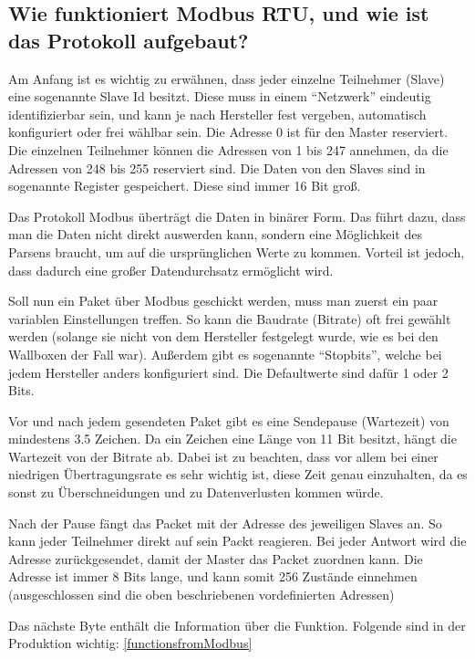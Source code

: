 \subsection{Wie funktioniert Modbus RTU, und wie ist das Protokoll aufgebaut?}
Am Anfang ist es wichtig zu erwähnen, dass jeder einzelne Teilnehmer (Slave) eine sogenannte Slave Id besitzt. Diese muss in einem “Netzwerk” eindeutig identifizierbar sein, und kann je nach Hersteller fest vergeben, automatisch konfiguriert oder frei wählbar sein. Die Adresse 0 ist für den Master reserviert. Die einzelnen Teilnehmer können die Adressen von 1 bis 247 annehmen, da die Adressen von 248 bis 255 reserviert sind. Die Daten von den Slaves sind in sogenannte Register gespeichert. Diese sind immer 16 Bit groß.  

Das Protokoll Modbus überträgt die Daten in binärer Form. Das führt dazu, dass man die Daten nicht direkt auswerden kann, sondern eine Möglichkeit des Parsens braucht, um auf die ursprünglichen Werte zu kommen. Vorteil ist jedoch, dass dadurch eine großer Datendurchsatz ermöglicht wird. 

 

Soll nun ein Paket über Modbus geschickt werden, muss man zuerst ein paar variablen Einstellungen treffen. So kann die Baudrate (Bitrate) oft frei gewählt werden (solange sie nicht von dem Hersteller festgelegt wurde, wie es bei den Wallboxen der Fall war). Außerdem gibt es sogenannte “Stopbits”, welche bei jedem Hersteller anders konfiguriert sind. Die Defaultwerte sind dafür 1 oder 2 Bits. 

 

Vor und nach jedem gesendeten Paket gibt es eine Sendepause (Wartezeit) von mindestens 3.5 Zeichen. Da ein Zeichen eine Länge von 11 Bit besitzt, hängt die Wartezeit von der Bitrate ab. Dabei ist zu beachten, dass vor allem bei einer niedrigen Übertragungsrate es sehr wichtig ist, diese Zeit genau einzuhalten, da es sonst zu Überschneidungen und zu Datenverlusten kommen würde.  

Nach der Pause fängt das Packet mit der Adresse des jeweiligen Slaves an. So kann jeder Teilnehmer direkt auf sein Packt reagieren. Bei jeder Antwort wird die Adresse zurückgesendet, damit der Master das Packet zuordnen kann. Die Adresse ist immer 8 Bits lange, und kann somit 256 Zustände einnehmen (ausgeschlossen sind die oben beschriebenen vordefinierten Adressen) 

Das nächste Byte enthält die Information über die Funktion. Folgende sind in der Produktion wichtig: \ref{functionsfromModbus}


